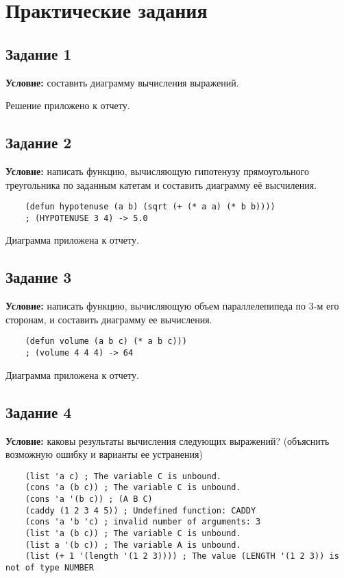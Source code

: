 \chapter{Практические задания}

\section{Задание 1}

\textbf{Условие:} составить диаграмму вычисления выражений.

Решение приложено к отчету.


\section{Задание 2}

\textbf{Условие:} написать функцию, вычисляющую гипотенузу прямоугольного треугольника по заданным катетам и составить диаграмму её высчиления.

\begin{lstlisting}
	(defun hypotenuse (a b) (sqrt (+ (* a a) (* b b))))
	; (HYPOTENUSE 3 4) -> 5.0
\end{lstlisting}

Диаграмма приложена к отчету.


\section{Задание 3}

\textbf{Условие:} написать функцию, вычисляющую объем параллелепипеда по 3-м его сторонам, и составить диаграмму ее вычисления.

\begin{lstlisting}
	(defun volume (a b c) (* a b c)))
	; (volume 4 4 4) -> 64
\end{lstlisting}

Диаграмма приложена к отчету.


\section{Задание 4}

\textbf{Условие:} каковы результаты вычисления следующих выражений? (объяснить возможную ошибку и варианты ее устранения)

\begin{lstlisting}
	(list 'a c) ; The variable C is unbound.
	(cons 'a (b c)) ; The variable C is unbound.
	(cons 'a '(b c)) ; (A B C)
	(caddy (1 2 3 4 5)) ; Undefined function: CADDY
	(cons 'a 'b 'c) ; invalid number of arguments: 3
	(list 'a (b c)) ; The variable C is unbound.
	(list a '(b c)) ; The variable A is unbound.
	(list (+ 1 '(length '(1 2 3)))) ; The value (LENGTH '(1 2 3)) is not of type NUMBER
\end{lstlisting}

